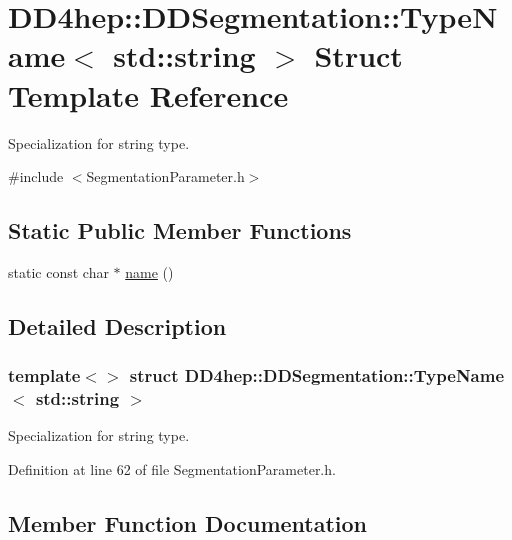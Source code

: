 \hypertarget{struct_d_d4hep_1_1_d_d_segmentation_1_1_type_name_3_01std_1_1string_01_4}{}\section{D\+D4hep\+:\+:D\+D\+Segmentation\+:\+:Type\+Name$<$ std\+:\+:string $>$ Struct Template Reference}
\label{struct_d_d4hep_1_1_d_d_segmentation_1_1_type_name_3_01std_1_1string_01_4}


Specialization for string type.  




{\ttfamily \#include $<$Segmentation\+Parameter.\+h$>$}

\subsection*{Static Public Member Functions}
\begin{DoxyCompactItemize}
\item 
static const char $\ast$ \hyperlink{struct_d_d4hep_1_1_d_d_segmentation_1_1_type_name_3_01std_1_1string_01_4_a3fb72c60bd5cfe7edc0342a572acde8b}{name} ()
\end{DoxyCompactItemize}


\subsection{Detailed Description}
\subsubsection*{template$<$$>$\newline
struct D\+D4hep\+::\+D\+D\+Segmentation\+::\+Type\+Name$<$ std\+::string $>$}

Specialization for string type. 

Definition at line 62 of file Segmentation\+Parameter.\+h.



\subsection{Member Function Documentation}
\hypertarget{struct_d_d4hep_1_1_d_d_segmentation_1_1_type_name_3_01std_1_1string_01_4_a3fb72c60bd5cfe7edc0342a572acde8b}{}\label{struct_d_d4hep_1_1_d_d_segmentation_1_1_type_name_3_01std_1_1string_01_4_a3fb72c60bd5cfe7edc0342a572acde8b} 
